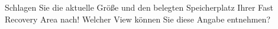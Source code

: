     \item Schlagen Sie die aktuelle Gr\"o\ss{}e und den belegten Speicherplatz Ihrer Fast Recovery Area nach! Welcher View k\"onnen Sie diese Angabe entnehmen?
